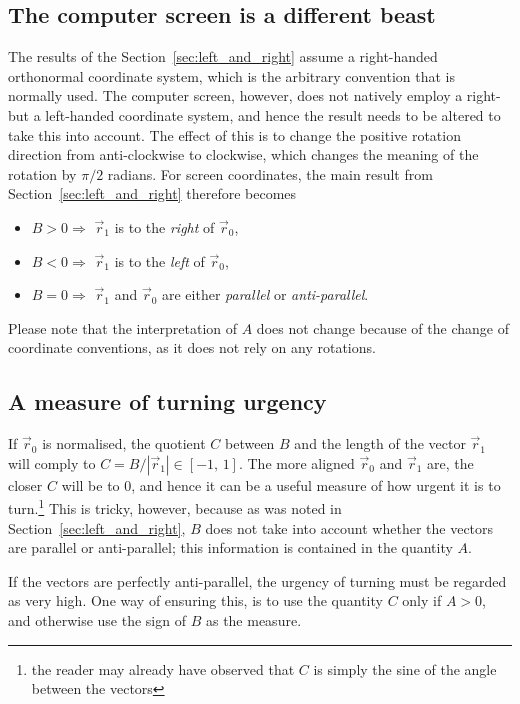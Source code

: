\documentclass[]{article} %
\begin{document}
\subsection{The computer screen is a different beast}
\label{sec:screen_coordinates}
The results of the Section~\ref{sec:left_and_right} assume a right-handed orthonormal coordinate system, which is the arbitrary convention that is normally used.
The computer screen, however, does not natively employ a right- but a left-handed coordinate system, and hence the result needs to be altered to take this into account.
The effect of this is to change the positive rotation direction from anti-clockwise to clockwise, which changes the meaning of the rotation by $\pi/2$ radians.
For screen coordinates, the main result from Section~\ref{sec:left_and_right} therefore becomes
\begin{itemize}
 \item $B > 0 \Longrightarrow$ $\vec{r}_1$ is to the \emph{right} of $\vec{r}_0$,
 \item $B < 0 \Longrightarrow$ $\vec{r}_1$ is to the \emph{left} of $\vec{r}_0$,
 \item $B = 0 \Longrightarrow$ $\vec{r}_1$ and $\vec{r}_0$ are either \emph{parallel} or \emph{anti-parallel}.
\end{itemize}

Please note that the interpretation of $A$ does not change because of the change of coordinate conventions, as it does not rely on any rotations.


\subsection{A measure of turning urgency}
\label{sec:turn_urgency}
If $\vec{r}_0$ is normalised, the quotient $C$ between $B$ and the length of the vector $\vec{r}_1$ will comply to $C = B/\left|\vec{r}_1\right| \in [-1,\, 1]$.
The more aligned $\vec{r}_0$ and $\vec{r}_1$ are, the closer $C$ will be to $0$, and hence it can be a useful measure of how urgent it is to turn.\footnote{the reader may already have observed that $C$ is simply the sine of the angle between the vectors}
This is tricky, however, because as was noted in Section~\ref{sec:left_and_right}, $B$ does not take into account whether the vectors are parallel or anti-parallel; this information is contained in the quantity $A$.

If the vectors are perfectly anti-parallel, the urgency of turning must be regarded as very high.
One way of ensuring this, is to use the quantity $C$ only if $A>0$, and otherwise use the sign of $B$ as the measure.


\newpage



\end{document}
